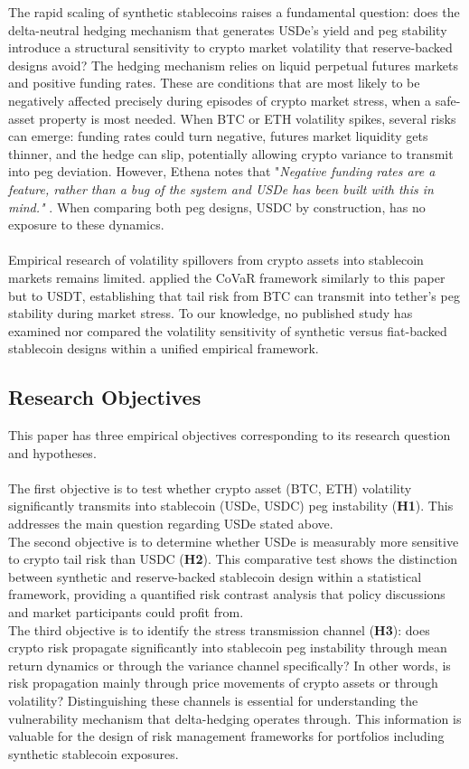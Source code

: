 \documentclass[12pt,a4paper,titlepage,oneside,english]{article}
\begin{document}
The rapid scaling of synthetic stablecoins raises a fundamental question: does the delta-neutral hedging mechanism that generates USDe's yield and peg stability introduce a structural sensitivity to crypto
market volatility that reserve-backed designs avoid? The hedging mechanism relies on liquid perpetual
futures markets and positive funding rates. These are conditions that are most likely to be negatively affected
precisely during episodes of crypto market stress, when a safe-asset property is most
needed. When BTC or ETH volatility spikes, several risks can emerge: funding rates could turn negative, futures
market liquidity gets thinner, and the hedge can slip, potentially allowing crypto variance to
transmit into peg deviation. However, Ethena notes that "\textit{Negative funding rates are a feature, 
rather than a bug of the system and USDe has been built with this in mind."} \parencite{ethena_docs}.
When comparing both peg designs, USDC by construction, has no exposure to these dynamics.\\
\\
Empirical research of volatility spillovers from crypto assets into stablecoin markets
remains limited. \parencite{Chen03032026} applied the CoVaR framework similarly to this paper but to USDT, establishing that tail risk from BTC can transmit into tether's peg stability during market stress. 
To our knowledge, no published study has examined nor compared the volatility sensitivity of synthetic versus fiat-backed stablecoin designs within a unified empirical framework.

\subsection{Research Objectives}
This paper has three empirical objectives corresponding to its research question and hypotheses.\\
\\
The first objective is to test whether crypto asset (BTC, ETH) volatility significantly transmits
into stablecoin (USDe, USDC) peg instability (\textbf{H1}). This addresses the main question regarding USDe stated above.\\
The second objective is to determine whether USDe is measurably more sensitive to
crypto tail risk than USDC (\textbf{H2}). This comparative test shows the
distinction between synthetic and reserve-backed stablecoin design within a statistical framework, providing a quantified risk contrast analysis that policy discussions and market participants
could profit from.\\
The third objective is to identify the stress transmission channel (\textbf{H3}): does
crypto risk propagate significantly into stablecoin peg instability through mean return dynamics or
through the variance channel specifically? In other words, is risk propagation mainly through price movements of crypto assets or through volatility? Distinguishing these channels is essential
for understanding the vulnerability mechanism that delta-hedging operates through. 
This information is valuable for the design of risk management frameworks for portfolios including synthetic
stablecoin exposures.\\
\end{document}
